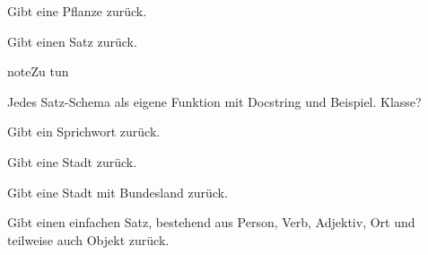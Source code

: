 \documentclass[a4paper,12pt,oneside]{sphinxmanual}
\begin{document}

\begin{fulllineitems}
\label{funktionen:pyzufall.pflanze}
Gibt eine Pflanze zurück.

\end{fulllineitems}


\begin{fulllineitems}
\label{funktionen:pyzufall.satz}
Gibt einen Satz zurück.

\begin{notice}{note}{Zu tun}

Jedes Satz-Schema als eigene Funktion mit Docstring und Beispiel. Klasse?
\end{notice}

\end{fulllineitems}


\begin{fulllineitems}
\label{funktionen:pyzufall.sprichwort}
Gibt ein Sprichwort zurück.

\end{fulllineitems}


\begin{fulllineitems}
\label{funktionen:pyzufall.stadt}
Gibt eine Stadt zurück.

\end{fulllineitems}


\begin{fulllineitems}
\label{funktionen:pyzufall.stadt_bl}
Gibt eine Stadt mit Bundesland zurück.

\end{fulllineitems}


\begin{fulllineitems}
\label{funktionen:pyzufall.standard_satz}
Gibt einen einfachen Satz, bestehend aus Person, Verb, Adjektiv, Ort und teilweise auch Objekt zurück.

\end{fulllineitems}
\end{document}
